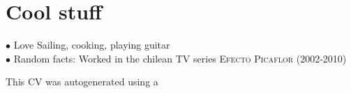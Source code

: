 \documentclass[11pt,a4paper,sans]{moderncv} %
\begin{document}


\section{Cool stuff}
$\bullet$ Love Sailing, cooking, playing guitar\\
$\bullet$ Random facts: Worked in the chilean TV series \textsc{Efecto Picaflor} (2002-2010)

This CV was autogenerated using a 
\end{document}
